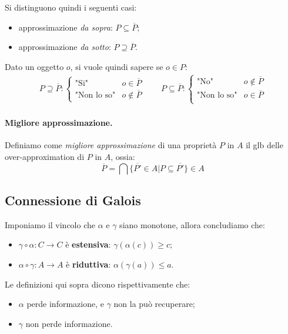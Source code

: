 \documentclass[a4paper, 11pt]{article}
\begin{document}
	Si distinguono quindi i seguenti casi:
	\begin{itemize}
		\item approssimazione \textit{da sopra}: $P \subseteq \overline{P}$;
		\item approssimazione \textit{da sotto}: $P \supseteq \overline{P}$.
	\end{itemize}
	
	Dato un oggetto $o$, si vuole quindi sapere se $o \in P$:
	\begin{align*}
		P \supseteq \overline{P}: \begin{cases}
			\text{"Si"} &o \in \overline{P} \\
			\text{"Non lo so"} &o \notin  \overline{P}
		\end{cases} \qquad
		P \subseteq \overline{P}: \begin{cases}
		\text{"No"} &o \notin \overline{P} \\
		\text{"Non lo so"} &o \in \overline{P}\\
		\end{cases}
	\end{align*} 
	
	\paragraph{Migliore approssimazione.}
	Definiamo come \textit{migliore approssimazione} di una proprietà $P$ in $A$ il glb delle over-approximation di $P$ in $A$, ossia: \[  \overline{P} = \bigcap \lbrace \overline{P'} \in A | P \subseteq \overline{P'} \rbrace \in A \]
	
	\subsection{Connessione di Galois}
	Imponiamo il vincolo che $\alpha$ e $\gamma$ siano monotone, allora concludiamo che: \begin{itemize}
		\item $\gamma \circ \alpha: C \to C$ è \textbf{estensiva}: $\gamma(\alpha(c)) \geq c$;
		\item $\alpha \circ \gamma : A \to A$ è \textbf{riduttiva}: $\alpha(\gamma(a)) \leq a$.
	\end{itemize}

	Le definizioni qui sopra dicono rispettivamente che:
	\begin{itemize}
		\item $\alpha$ perde informazione, e $\gamma$ non la può recuperare;
		\item $\gamma$ non perde informazione.
	\end{itemize}
\end{document}
